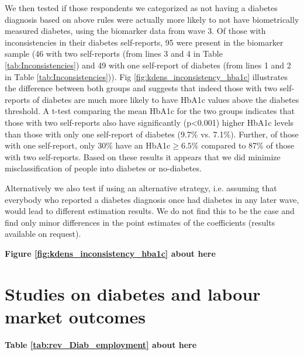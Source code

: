 \documentclass[10pt,letterpaper]{article}
\begin{document}
\begin{appendix}
	
	We then tested if those respondents we categorized as not having a diabetes diagnosis based on above rules were actually more likely to not have biometrically measured diabetes, using the biomarker data from wave 3. Of those with inconsistencies in their diabetes self-reports, 95 were present in the biomarker sample (46 with two self-reports (from lines 3 and 4 in Table \ref{tab:Inconsistencies}) and 49 with one self-report of diabetes (from lines 1 and 2 in Table \ref{tab:Inconsistencies})). Fig \ref{fig:kdens_inconsistency_hba1c} illustrates the difference between both groups and suggests that indeed those with two self-reports of diabetes are much more likely to have \ac{HbA1c} values above the diabetes threshold. A t-test comparing the mean \ac{HbA1c} for the two groups indicates that those with two self-reports also have significantly (p<0.001) higher \ac{HbA1c} levels than those with only one self-report of diabetes (9.7\% vs. 7.1\%). Further, of those with one self-report,  only 30\% have an \ac{HbA1c}$\geq6.5$\% compared to 87\% of those with two self-reports. Based on these results it appears that we did minimize misclassification of people into diabetes or no-diabetes. 
	
	Alternatively we also test if using an alternative strategy, i.e. assuming that everybody who reported  a diabetes diagnosis once had diabetes in any later wave, would lead to different estimation results. We do not find this to be the case and find only minor differences in the point estimates of the coefficients (results available on request). 
	
	\begin{center}
		\textbf{Figure \ref{fig:kdens_inconsistency_hba1c} about here}
	\end{center}
	
	
	\section*{\label{sec:Appendix_B}Studies on diabetes and labour market outcomes}
	\begin{center}
		\textbf{Table \ref{tab:rev_Diab_employment} about here}
	\end{center}
	
	
	
\end{appendix}





\end{document}
